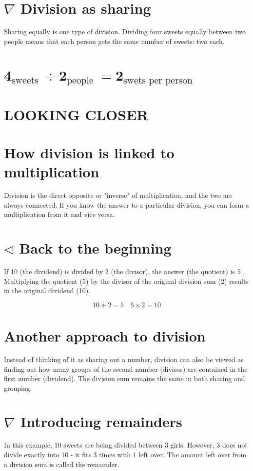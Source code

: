 \documentclass[10pt]{article}
\begin{document}
\section*{$\nabla$ Division as sharing}
Sharing equally is one type of division. Dividing four sweets equally between two people means that each person gets the same number of sweets: two each.

\section*{$\mathbf{4}_{\text {sweets }} \div \mathbf{2}_{\text {people }}=\mathbf{2}_{\text {swets per person }}$}
\section*{LOOKING CLOSER}
\section*{How division is linked to multiplication}
Division is the direct opposite or "inverse" of multiplication, and the two are always connected. If you know the answer to a particular division, you can form a multiplication from it and vice versa.

\section*{$\triangleleft$ Back to the beginning}
If 10 (the dividend) is divided by 2 (the divisor), the answer (the quotient) is 5 . Multiplying the quotient (5) by the divisor of the original division sum (2) results in the original dividend (10).

$$
10 \div 2=5 \quad 5 \times 2=10
$$

\section*{Another approach to division}
Instead of thinking of it as sharing out a number, division can also be viewed as finding out how many groups of the second number (divisor) are contained in the first number (dividend). The division sum remains the same in both sharing and grouping.

\section*{$\nabla$ Introducing remainders}
In this example, 10 sweets are being divided between 3 girls. However, 3 does not divide exactly into 10 - it fits 3 times with 1 left over. The amount left over from a division sum is called the remainder.
\end{document}
